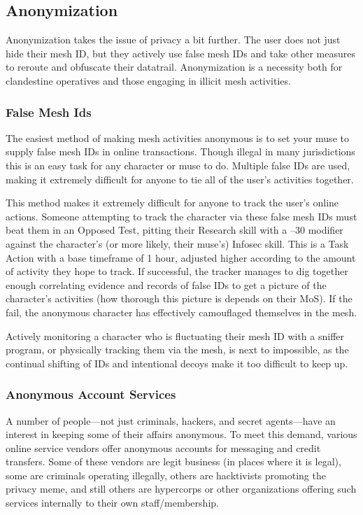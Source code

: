 \subsection{Anonymization}

Anonymization takes the issue of privacy a bit further. 
The user does not just hide their mesh ID, but they 
actively use false mesh IDs and take other measures to 
reroute and obfuscate their datatrail. Anonymization 
is a necessity both for clandestine operatives and those 
engaging in illicit mesh activities.

\subsubsection{False Mesh Ids}

The easiest method of making mesh activities anonymous
is to set your muse to supply false mesh IDs in
online transactions. Though illegal in many jurisdictions
this is an easy task for any character or muse to
do. Multiple false IDs are used, making it extremely difficult
for anyone to tie all of the user's activities together.

This method makes it extremely difficult for anyone 
to track the user's online actions. Someone attempting 
to track the character via these false mesh IDs must 
beat them in an Opposed Test, pitting their Research 
skill with a –30 modifier against the character's (or 
more likely, their muse's) Infosec skill. This is a Task 
Action with a base timeframe of 1 hour, adjusted 
higher according to the amount of activity they hope 
to track. If successful, the tracker manages to dig 
together enough correlating evidence and records of 
false IDs to get a picture of the character's activities 
(how thorough this picture is depends on their MoS). 
If the fail, the anonymous character has effectively 
camouflaged themselves in the mesh.

Actively monitoring a character who is fluctuating 
their mesh ID with a sniffer program, or physically 
tracking them via the mesh, is next to impossible, as 
the continual shifting of IDs and intentional decoys 
make it too difficult to keep up.

\subsubsection{Anonymous Account Services}

A number of people—not just criminals, hackers, and 
secret agents—have an interest in keeping some of 
their affairs anonymous. To meet this demand, various 
online service vendors offer anonymous accounts for 
messaging and credit transfers. Some of these vendors 
are legit business (in places where it is legal), some 
are criminals operating illegally, others are hacktivists 
promoting the privacy meme, and still others are hypercorps
or other organizations offering such services
internally to their own staff/membership.

